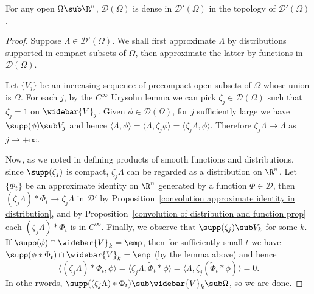 \begin{proposition}
For any open $\Omega\sub\R^n$, $\mathscr{D}(\Omega)$ is dense in $\mathscr{D}'(\Omega)$ in the topology of $\mathscr{D}'(\Omega)$.
\end{proposition}
\begin{proof}
Suppose $\Lambda\in\mathscr{D}'(\Omega)$. We shall first approximate $\Lambda$ by distributions supported in compact subsets of $\Omega$, then approximate the latter by functions in $\mathscr{D}(\Omega)$.\par
Let $\{V_j\}$ be an increasing sequence of precompact open subsets of $\Omega$ whose union is $\Omega$. For each $j$, by the $C^\infty$ Urysohn lemma we can pick $\zeta_j\in\mathscr{D}(\Omega)$ such that $\zeta_j=1$ on $\widebar{V}_j$. Given $\phi\in\mathscr{D}(\Omega)$, for $j$ sufficiently large we have $\supp(\phi)\sub V_j$ and hence $\langle\Lambda,\phi\rangle=\langle\Lambda,\zeta_j\phi\rangle=\langle\zeta_j\Lambda,\phi\rangle$. Therefore $\zeta_j\Lambda\to\Lambda$ as $j\to+\infty$.\par
Now, as we noted in defining products of smooth functions and distributions, since $\supp(\zeta_j)$ is compact, $\zeta_j\Lambda$ can be regarded as a distribution on $\R^n$. Let $\{\Phi_t\}$ be an approximate identity on $\R^n$ generated by a function $\Phi\in\mathscr{D}$, then $(\zeta_j\Lambda)\ast\Phi_t\to\zeta_j\Lambda$ in $\mathscr{D}'$ by Proposition~\ref{convolution approximate identity in distribution}, and by Proposition~\ref{convolution of distribution and function prop} each $(\zeta_j\Lambda)\ast\Phi_t$ is in $C^\infty$. Finally, we observe that $\supp(\zeta_j)\sub V_k$ for some $k$. If $\supp(\phi)\cap\widebar{V}_k=\emp$, then for sufficiently small $t$ we have $\supp(\phi\ast\Phi_t)\cap\widebar{V}_k=\emp$ (by the lemma above) and hence
\[\langle(\zeta_j\Lambda)\ast\Phi_t,\phi\rangle=\langle\zeta_j\Lambda,\widetilde{\Phi}_t\ast\phi\rangle=\langle\Lambda,\zeta_j(\widetilde{\Phi}_t\ast\phi)\rangle=0.\]
In othe rwords, $\supp((\zeta_j\Lambda)\ast\Phi_t)\sub\widebar{V}_k\sub\Omega$, so we are done.
\end{proof}
